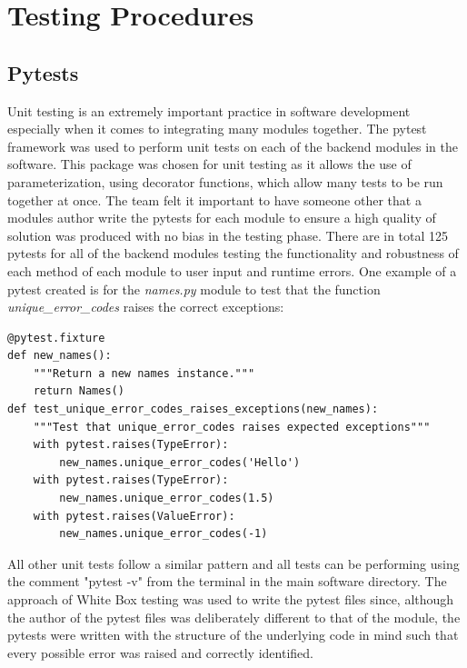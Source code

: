 \documentclass{article}					%
\begin{document}
\section{Testing Procedures}
\subsection{Pytests}
Unit testing is an extremely important practice in software development especially when it comes to integrating many modules together. The pytest framework was used to perform unit tests on each of the backend modules in the software. This package was chosen for unit testing as it allows the use of parameterization, using decorator functions, which allow many tests to be run together at once. The team felt it important to have someone other that a modules author write the pytests for each module to ensure a high quality of solution was produced with no bias in the testing phase. There are in total 125 pytests for all of the backend modules testing the functionality and robustness of each method of each module to user input and runtime errors. One example of a pytest created is for the \textit{names.py} module to test that the function \textit{unique\_error\_codes} raises the correct exceptions:
\begin{verbatim}
@pytest.fixture
def new_names():
    """Return a new names instance."""
    return Names()
def test_unique_error_codes_raises_exceptions(new_names):
    """Test that unique_error_codes raises expected exceptions"""
    with pytest.raises(TypeError):
        new_names.unique_error_codes('Hello')
    with pytest.raises(TypeError):
        new_names.unique_error_codes(1.5)
    with pytest.raises(ValueError):
        new_names.unique_error_codes(-1)
\end{verbatim}
All other unit tests follow a similar pattern and all tests can be performing using the comment "pytest -v" from the terminal in the main software directory. The approach of White Box testing was used to write the pytest files since, although the author of the pytest files was deliberately different to that of the module, the pytests were written with the structure of the underlying code in mind such that every possible error was raised and correctly identified.
\end{document}
